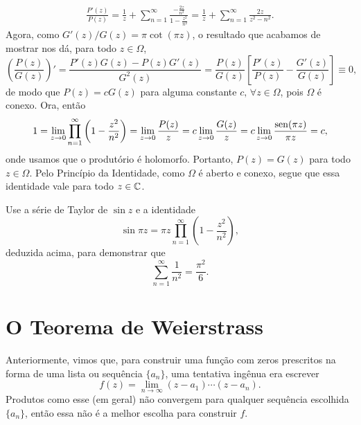 \begin{exemplo}
        \begin{align*}
            \frac{P'(z)}{P(z)} =
            \frac{1}{z} + \sum_{n=1}^{\infty} \frac{ -\frac{2z}{n^2} }{ 1 - \frac{z^2}{n^2} }
            = \frac{1}{z} + \sum_{n=1}^{\infty} \frac{2z}{z^2 - n^2}.
        \end{align*}
        Agora, como $G'(z)/G(z) = \pi\cot(\pi z)$, 
        o resultado que acabamos de mostrar
        nos dá, para todo $z\in\Omega$,
        \begin{equation*}
            \left( \frac{P(z)}{G(z)} \right)'
            = \frac{ P'(z)G(z) - P(z)G'(z) }{ G^2(z) }
            = \frac{P(z)}{G(z)}\left[ \frac{P'(z)}{P(z)} - \frac{G'(z)}{G(z)} \right]
            \equiv 0,
        \end{equation*}
        de modo que $P(z) = cG(z)$ para alguma constante $c, \, \forall z\in\Omega$,
        pois $\Omega$ é conexo. 
        Ora, então
        \begin{equation*}
            1 
            = \lim_{z\to 0} \prod_{n=1}^{\infty} \left( 1 - \frac{z^2}{n^2} \right)
            = \lim_{z\to 0} \frac{P(z)}{z} 
            = c\lim_{z\to 0} \frac{G(z)}{z}
            = c\lim_{z\to 0} \frac{\operatorname{sen}(\pi z)}{\pi z}
            = c,
        \end{equation*}
        onde usamos que o produtório é holomorfo.
        Portanto, $P(z) = G(z)$ para todo $z\in\Omega$. 
        Pelo Princípio da Identidade,
        como $\Omega$ é aberto e conexo, segue que essa identidade vale para todo
        $z\in\mathbb{C}$.
    \end{exemplo}
    \begin{exercicio}
        Use a série de Taylor de $\sin z$ e a identidade 
        \[
          \sin \pi z = \pi z\prod_{n=1}^\infty \left(1 - \frac{z^2}{n^2}\right),
        \]
        deduzida acima, para demonstrar que 
        \[
          \sum_{n=1}^\infty \frac{1}{n^2} = \frac{\pi^2}{6}.
        \]
    \end{exercicio}
    
\section{O Teorema de Weierstrass}
    
    Anteriormente, vimos que, para construir uma função com zeros prescritos 
    na forma de uma lista ou sequência $\{a_n\}$, 
    uma tentativa ingênua era escrever
    $$ f(z) = \lim_{n \to \infty} (z-a_1) \cdots (z-a_n).$$
    Produtos como esse (em geral) não convergem para qualquer sequência 
    escolhida $\{a_n\}$, então essa não é a melhor escolha para construir $f$. 
    
